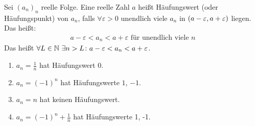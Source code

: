 \begin{definition}[Häufungswert]
    Sei $(a_n)_n$ reelle Folge. Eine reelle Zahl $a$ heißt Häufungswert (oder Häufungspunkt) von $a_n$, falls $\forall \varepsilon >0$ unendlich viele $a_n$ in $\left(a-\varepsilon, a+\varepsilon\right)$ liegen. Das heißt:
    \begin{align*}
        a-\varepsilon < a_n < a+ \varepsilon\text{ für unendlich viele $n$}
    \end{align*}
    Das heißt $\forall L\in\mathbb{N}~\exists n> L\colon a-\varepsilon < a_n < a+\varepsilon$.
\end{definition}

\begin{beispiel}
    \theoremescape
    \begin{enumerate}
        \item $a_n=\frac{1}{n}$ hat Häufungswert 0.
        \item $a_n=(-1)^n$ hat Häufungswerte $1$, $-1$.
        \item $a_n=n$ hat keinen Häufungswert.
        \item $a_n=(-1)^n+\frac{1}{n}$ hat Häufungswerte 1, -1.
    \end{enumerate}
\end{beispiel}

